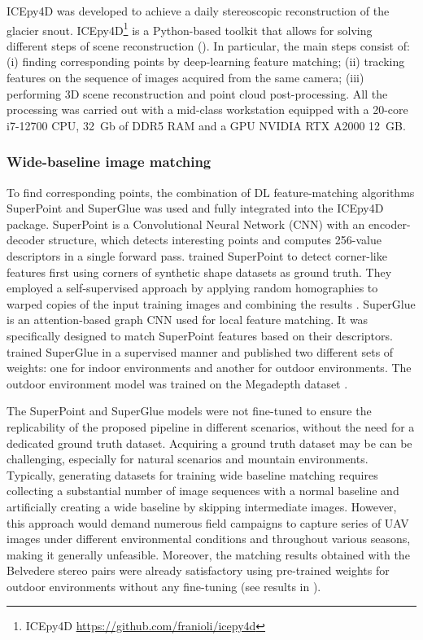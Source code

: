 ICEpy4D was developed to achieve a daily stereoscopic reconstruction of the glacier snout.
ICEpy4D\footnote{ICEpy4D \url{https://github.com/franioli/icepy4d}} is a Python-based toolkit that allows for solving different steps of scene reconstruction
(). 
In particular, the main steps consist of:
(i) finding corresponding points by deep-learning feature matching;
(ii) tracking features on the sequence of images acquired from the same camera;
(iii) performing 3D scene reconstruction and point cloud post-processing.
All the processing was carried out with a mid-class workstation equipped with a 20-core
i7-12700 CPU, 32~Gb of DDR5 RAM and a GPU NVIDIA RTX A2000 12~GB.

\subsubsection{Wide-baseline image matching}\label{sec:4:matching}

To find corresponding points, the combination of DL feature-matching algorithms
SuperPoint \citep{DeTone_2018} and SuperGlue \citep{sarlin2020superglue} was used and
fully integrated into the ICEpy4D package.
SuperPoint is a Convolutional Neural Network (CNN) with an encoder-decoder
structure, which detects interesting points and computes 256-value descriptors in a
single forward pass.
\citet{DeTone_2018} trained SuperPoint to detect corner-like features first using corners
of synthetic shape datasets as ground truth.
They employed a self-supervised approach by applying random homographies to warped
copies of the input training images and combining the results \citep{DeTone_2018}.
SuperGlue is an attention-based graph CNN used for local feature matching.
It was specifically designed to match SuperPoint features based on their descriptors.
\citet{sarlin2020superglue} trained SuperGlue in a supervised manner and published two
different sets of weights: one for indoor environments and another for outdoor
environments.
The outdoor environment model was trained on the Megadepth dataset
\citep{Li_Snavely_2018_MegaDepth}.

The SuperPoint and SuperGlue models were not fine-tuned to ensure the replicability of
the proposed pipeline in different scenarios, without the need for a
dedicated ground truth dataset.
Acquiring a ground truth dataset may be can be challenging, especially for natural
scenarios and mountain environments.
Typically, generating datasets for training wide baseline matching requires collecting a
substantial number of image sequences with a normal baseline and artificially creating a
wide baseline by skipping intermediate images.
However, this approach would demand numerous field campaigns to capture series of UAV
images under different environmental conditions and throughout various seasons, making it
generally unfeasible.
Moreover, the matching results obtained with the Belvedere stereo pairs were already
satisfactory using pre-trained weights for outdoor environments without any fine-tuning
(see results in ).

